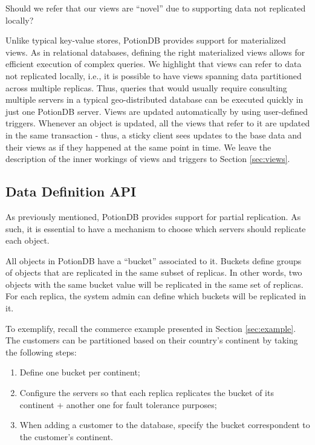 \documentclass{vldb}
\newcommand{\grumbler}[2]{{\color{red}{\bf #1:} #2}}
\newcommand{\andre}[1]{\grumbler{andre}{#1}}
\begin{document}
\andre{Should we refer that our views are ``novel'' due to supporting data not replicated locally?}

Unlike typical key-value stores, PotionDB provides support for materialized views.
As in relational databases, defining the right materialized views allows for efficient execution of complex queries.
We highlight that views can refer to data not replicated locally, i.e., it is possible to have views spanning data partitioned across multiple replicas.
Thus, queries that would usually require consulting multiple servers in a typical geo-distributed database can be executed quickly in just one PotionDB server.
Views are updated automatically by using user-defined triggers.
Whenever an object is updated, all the views that refer to it are updated in the same transaction - thus, a sticky client sees updates to the base data and their views as if they happened at the same point in time.
We leave the description of the inner workings of views and triggers to Section \ref{sec:views}.


\subsection{Data Definition API}

As previously mentioned, PotionDB provides support for partial replication.
As such, it is essential to have a mechanism to choose which servers should replicate each object.

All objects in PotionDB have a ``bucket'' associated to it.
Buckets define groups of objects that are replicated in the same subset of replicas. In other words, two objects with the same bucket value will be replicated in the same set of replicas.
For each replica, the system admin can define which buckets will be replicated in it.

To exemplify, recall the commerce example presented in Section \ref{sec:example}.
The customers can be partitioned based on their country's continent by taking the following steps: 

\begin{enumerate}
	\item Define one bucket per continent;
	\item Configure the servers so that each replica replicates the bucket of its continent + another one for fault tolerance purposes;
	\item When adding a customer to the database, specify the bucket correspondent to the customer's continent.
\end{enumerate}
\end{document}
